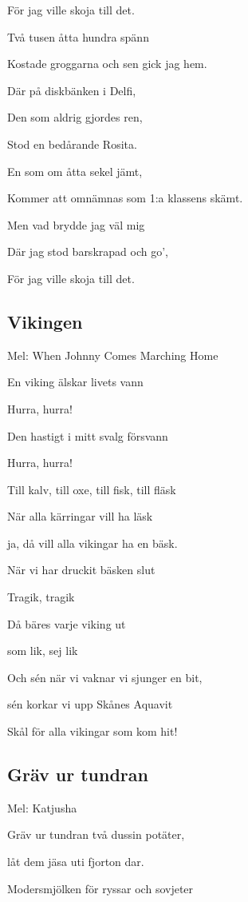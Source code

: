 För jag ville skoja till det.\bigskip

Två tusen åtta hundra spänn

Kostade groggarna och sen gick jag hem.

Där på diskbänken i Delfi,

Den som aldrig gjordes ren,

Stod en bedårande Rosita.\bigskip

En som om åtta sekel jämt,

Kommer att omnämnas som 1:a klassens skämt.

Men vad brydde jag väl mig

Där jag stod barskrapad och go’,

För jag ville skoja till det. \bigskip

\subsection{\textbf{Vikingen}}

Mel: When Johnny Comes Marching Home \bigskip


En viking älskar livets vann

Hurra, hurra!

Den hastigt i mitt svalg försvann

Hurra, hurra!

Till kalv, till oxe, till fisk, till fläsk

När alla kärringar vill ha läsk

ja, då vill alla vikingar ha en bäsk.\bigskip

När vi har druckit bäsken slut

Tragik, tragik

Då bäres varje viking ut

som lik, sej lik

Och sén när vi vaknar vi sjunger en bit,

sén korkar vi upp Skånes Aquavit\bigskip

Skål för alla vikingar som kom hit!

\subsection{\textbf{Gräv ur tundran}}

Mel: Katjusha\bigskip


Gräv ur tundran två dussin potäter,

låt dem jäsa uti fjorton dar.

Modersmjölken för ryssar och sovjeter

